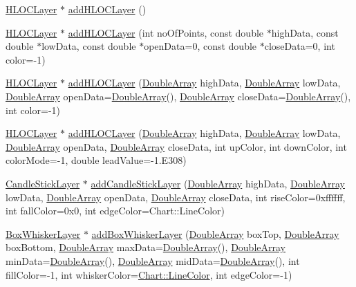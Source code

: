\begin{DoxyCompactItemize}
\item 
\hyperlink{class_h_l_o_c_layer}{H\+L\+O\+C\+Layer} $\ast$ \hyperlink{class_x_y_chart_adba2697a37e2367ce4f0a53611973098}{add\+H\+L\+O\+C\+Layer} ()
\item 
\hyperlink{class_h_l_o_c_layer}{H\+L\+O\+C\+Layer} $\ast$ \hyperlink{class_x_y_chart_a5a958e7d784c9bc14da62ef52dd435db}{add\+H\+L\+O\+C\+Layer} (int no\+Of\+Points, const double $\ast$high\+Data, const double $\ast$low\+Data, const double $\ast$open\+Data=0, const double $\ast$close\+Data=0, int color=-\/1)
\item 
\hyperlink{class_h_l_o_c_layer}{H\+L\+O\+C\+Layer} $\ast$ \hyperlink{class_x_y_chart_a963f78dc8d5d36ffa3fabcfbbedf4a89}{add\+H\+L\+O\+C\+Layer} (\hyperlink{class_double_array}{Double\+Array} high\+Data, \hyperlink{class_double_array}{Double\+Array} low\+Data, \hyperlink{class_double_array}{Double\+Array} open\+Data=\hyperlink{class_double_array}{Double\+Array}(), \hyperlink{class_double_array}{Double\+Array} close\+Data=\hyperlink{class_double_array}{Double\+Array}(), int color=-\/1)
\item 
\hyperlink{class_h_l_o_c_layer}{H\+L\+O\+C\+Layer} $\ast$ \hyperlink{class_x_y_chart_a40850db454a426061148872d99ba382e}{add\+H\+L\+O\+C\+Layer} (\hyperlink{class_double_array}{Double\+Array} high\+Data, \hyperlink{class_double_array}{Double\+Array} low\+Data, \hyperlink{class_double_array}{Double\+Array} open\+Data, \hyperlink{class_double_array}{Double\+Array} close\+Data, int up\+Color, int down\+Color, int color\+Mode=-\/1, double lead\+Value=-\/1.\+E308)
\item 
\hyperlink{class_candle_stick_layer}{Candle\+Stick\+Layer} $\ast$ \hyperlink{class_x_y_chart_ae6ebf6d55fae7f770f8d54ba52c5265c}{add\+Candle\+Stick\+Layer} (\hyperlink{class_double_array}{Double\+Array} high\+Data, \hyperlink{class_double_array}{Double\+Array} low\+Data, \hyperlink{class_double_array}{Double\+Array} open\+Data, \hyperlink{class_double_array}{Double\+Array} close\+Data, int rise\+Color=0xffffff, int fall\+Color=0x0, int edge\+Color=\+Chart\+::\+Line\+Color)
\item 
\hyperlink{class_box_whisker_layer}{Box\+Whisker\+Layer} $\ast$ \hyperlink{class_x_y_chart_ab1da3dced1b6702fb3e230f6d3a94a05}{add\+Box\+Whisker\+Layer} (\hyperlink{class_double_array}{Double\+Array} box\+Top, \hyperlink{class_double_array}{Double\+Array} box\+Bottom, \hyperlink{class_double_array}{Double\+Array} max\+Data=\hyperlink{class_double_array}{Double\+Array}(), \hyperlink{class_double_array}{Double\+Array} min\+Data=\hyperlink{class_double_array}{Double\+Array}(), \hyperlink{class_double_array}{Double\+Array} mid\+Data=\hyperlink{class_double_array}{Double\+Array}(), int fill\+Color=-\/1, int whisker\+Color=\hyperlink{namespace_chart_abee0d882fdc9ad0b001245ad9fc64011a04817a359476e87a5c572a7a69cdaaec}{Chart\+::\+Line\+Color}, int edge\+Color=-\/1)

\end{DoxyCompactItemize}
